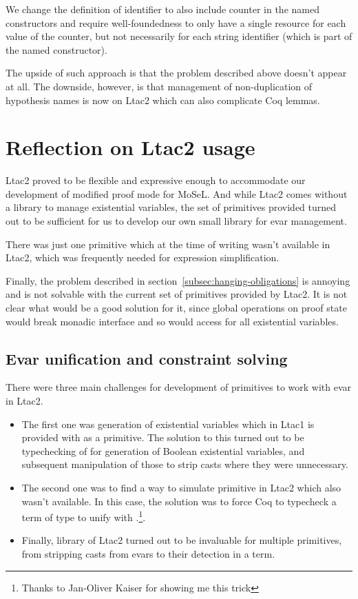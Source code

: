 We change the definition of identifier to also include counter in the named constructors and require well-foundedness to only have a single resource for each value of the counter, but not necessarily for each string identifier (which is part of the named constructor).

The upside of such approach is that the problem described above doesn't appear at all.
The downside, however, is that management of non-duplication of hypothesis names is now on Ltac2 which can also complicate Coq lemmas.

\section{Reflection on Ltac2 usage}

Ltac2 proved to be flexible and expressive enough to accommodate our development of modified proof mode for MoSeL.
And while Ltac2 comes without a library to manage existential variables, the set of primitives provided turned out to be sufficient for us to develop our own small library for evar management.

There was just one primitive which at the time of writing wasn't available in Ltac2,  which was frequently needed for expression simplification.

Finally, the problem described in section~\ref{subsec:hanging-obligations} is annoying and is not solvable with the current set of primitives provided by Ltac2.
It is not clear what would be a good solution for it, since global operations on proof state would break monadic interface and so would access for all existential variables.

\subsection{Evar unification and constraint solving}
\label{subsec:evar-unification-and-constr-solving}

There were three main challenges for development of primitives to work with evar in Ltac2.
\begin{itemize}
\item The first one was generation of existential variables which in Ltac1 is provided with as a primitive.
  The solution to this turned out to be typechecking of  for generation of Boolean existential variables, and subsequent manipulation of those to strip casts where they were unnecessary.
\item The second one was to find a way to simulate  primitive in Ltac2 which also wasn't available.
  In this case, the solution was to force Coq to typecheck a term of type  to unify  with .\footnote{Thanks to Jan-Oliver Kaiser for showing me this trick}.
\item Finally,  library of Ltac2 turned out to be invaluable for multiple primitives, from stripping casts from evars to their detection in a term.
\end{itemize}

